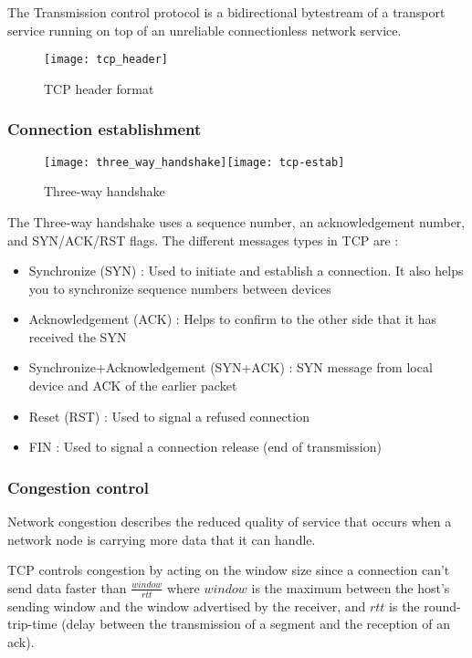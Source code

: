The Transmission control protocol is a bidirectional bytestream of a  transport service running on top of an unreliable connectionless network service.
\begin{figure}[H]
    \centering
    \texttt{[image: tcp\_header]}
    \caption{TCP header format}
\end{figure}

\subsubsection{Connection establishment}

\begin{figure}[H]
    \centering
    \texttt{[image: three\_way\_handshake]}\hfill	\texttt{[image: tcp-estab]}
	\caption{Three-way handshake}
\end{figure}

The Three-way handshake uses a sequence number, an acknowledgement number, and SYN/ACK/RST flags.
The different messages types in TCP are :
\begin{itemize}
\item Synchronize (SYN) : Used to initiate and establish a connection. It also helps you to synchronize sequence numbers between devices
\item Acknowledgement (ACK) : Helps to confirm to the other side that it has received the SYN
\item Synchronize+Acknowledgement (SYN+ACK) : SYN message from local device and ACK of the earlier packet
\item Reset (RST) : Used to signal a refused connection
\item FIN : Used to signal a connection release (end of transmission)
\end{itemize}

\subsubsection{Congestion control}

Network congestion describes the reduced quality of service that occurs when a network node is carrying more data that it can handle.

TCP controls congestion by acting on the window size since a connection can't send data faster than $\frac{window}{rtt}$ where $window$ is the maximum between the host's sending window and the window advertised by the receiver, and $rtt$ is the round-trip-time (delay between the transmission of a segment and the reception of an ack).

